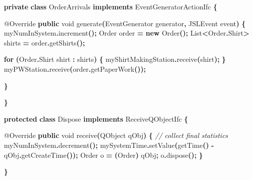 \documentclass[
]{book}
\newenvironment{Shaded}{\begin{snugshade}}{\end{snugshade}}
\newcommand{\AttributeTok}[1]{\textcolor[rgb]{0.77,0.63,0.00}{#1}}
\newcommand{\BuiltInTok}[1]{#1}
\newcommand{\CommentTok}[1]{\textcolor[rgb]{0.56,0.35,0.01}{\textit{#1}}}
\newcommand{\ControlFlowTok}[1]{\textcolor[rgb]{0.13,0.29,0.53}{\textbf{#1}}}
\newcommand{\DataTypeTok}[1]{\textcolor[rgb]{0.13,0.29,0.53}{#1}}
\newcommand{\FunctionTok}[1]{\textcolor[rgb]{0.00,0.00,0.00}{#1}}
\newcommand{\KeywordTok}[1]{\textcolor[rgb]{0.13,0.29,0.53}{\textbf{#1}}}
\newcommand{\NormalTok}[1]{#1}
\newcommand{\OperatorTok}[1]{\textcolor[rgb]{0.81,0.36,0.00}{\textbf{#1}}}
\theoremstyle{definition}
\theoremstyle{definition}
\theoremstyle{definition}
\theoremstyle{definition}
\theoremstyle{remark}
\begin{document}
\begin{Shaded}
\begin{Highlighting}[]
    \KeywordTok{private} \KeywordTok{class}\NormalTok{ OrderArrivals }\KeywordTok{implements}\NormalTok{ EventGeneratorActionIfc }\OperatorTok{\{}

        \AttributeTok{@Override}
        \KeywordTok{public} \DataTypeTok{void} \FunctionTok{generate}\OperatorTok{(}\NormalTok{EventGenerator generator}\OperatorTok{,}\NormalTok{ JSLEvent event}\OperatorTok{)} \OperatorTok{\{}
\NormalTok{            myNumInSystem}\OperatorTok{.}\FunctionTok{increment}\OperatorTok{();}
\NormalTok{            Order order }\OperatorTok{=} \KeywordTok{new} \FunctionTok{Order}\OperatorTok{();}
            \BuiltInTok{List}\OperatorTok{\textless{}}\NormalTok{Order}\OperatorTok{.}\FunctionTok{Shirt}\OperatorTok{\textgreater{}}\NormalTok{ shirts }\OperatorTok{=}\NormalTok{ order}\OperatorTok{.}\FunctionTok{getShirts}\OperatorTok{();}

            \ControlFlowTok{for} \OperatorTok{(}\NormalTok{Order}\OperatorTok{.}\FunctionTok{Shirt}\NormalTok{ shirt }\OperatorTok{:}\NormalTok{ shirts}\OperatorTok{)} \OperatorTok{\{}
\NormalTok{                myShirtMakingStation}\OperatorTok{.}\FunctionTok{receive}\OperatorTok{(}\NormalTok{shirt}\OperatorTok{);}
            \OperatorTok{\}}
\NormalTok{            myPWStation}\OperatorTok{.}\FunctionTok{receive}\OperatorTok{(}\NormalTok{order}\OperatorTok{.}\FunctionTok{getPaperWork}\OperatorTok{());}

        \OperatorTok{\}}

    \OperatorTok{\}}

    \KeywordTok{protected} \KeywordTok{class}\NormalTok{ Dispose }\KeywordTok{implements}\NormalTok{ ReceiveQObjectIfc }\OperatorTok{\{}

        \AttributeTok{@Override}
        \KeywordTok{public} \DataTypeTok{void} \FunctionTok{receive}\OperatorTok{(}\NormalTok{QObject qObj}\OperatorTok{)} \OperatorTok{\{}
            \CommentTok{// collect final statistics}
\NormalTok{            myNumInSystem}\OperatorTok{.}\FunctionTok{decrement}\OperatorTok{();}
\NormalTok{            mySystemTime}\OperatorTok{.}\FunctionTok{setValue}\OperatorTok{(}\FunctionTok{getTime}\OperatorTok{()} \OperatorTok{{-}}\NormalTok{ qObj}\OperatorTok{.}\FunctionTok{getCreateTime}\OperatorTok{());}
\NormalTok{            Order o }\OperatorTok{=} \OperatorTok{(}\NormalTok{Order}\OperatorTok{)}\NormalTok{ qObj}\OperatorTok{;}
\NormalTok{            o}\OperatorTok{.}\FunctionTok{dispose}\OperatorTok{();}
        \OperatorTok{\}}

    \OperatorTok{\}}
\end{Highlighting}
\end{Shaded}
\end{document}

